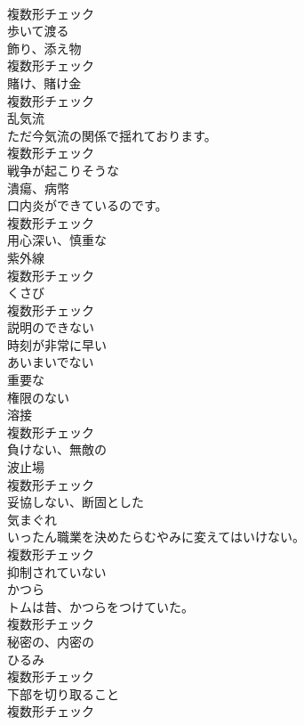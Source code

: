 \documentclass[8pt]{extreport}
\begin{document}
\begin{CJK}{UTF8}{min}
\\	複数形チェック
\\	[動詞]	歩いて渡る	
\\	[名詞]	飾り、添え物	
\\	複数形チェック
\\	[名詞]	賭け、賭け金	
\\	複数形チェック
\\	[名詞]	乱気流	
\\	ただ今気流の関係で揺れております。	
\\	複数形チェック
\\	[形容詞]	戦争が起こりそうな	
\\	[名詞]	潰瘍、病幣	
\\	口内炎ができているのです。	
\\	複数形チェック
\\	[形容詞]	用心深い、慎重な	
\\	[名詞]	紫外線	
\\	複数形チェック
\\	[名詞]	くさび	
\\	複数形チェック
\\	[形容詞]	説明のできない	
\\	[形容詞]	時刻が非常に早い	
\\	[形容詞]	あいまいでない	
\\	[形容詞]	重要な	
\\	[形容詞]	権限のない	
\\	[名詞]	溶接	
\\	複数形チェック
\\	[形容詞]	負けない、無敵の	
\\	[名詞]	波止場	
\\	複数形チェック
\\	[形容詞]	妥協しない、断固とした	
\\	[名詞]	気まぐれ	
\\	いったん職業を決めたらむやみに変えてはいけない。	
\\	複数形チェック
\\	[形容詞]	抑制されていない	
\\	[名詞]	かつら	
\\	トムは昔、かつらをつけていた。	
\\	複数形チェック
\\	[形容詞]	秘密の、内密の	
\\	[名詞]	ひるみ	
\\	複数形チェック
\\	[名詞]	下部を切り取ること	
\\	複数形チェック

\end{CJK}
\end{document}
